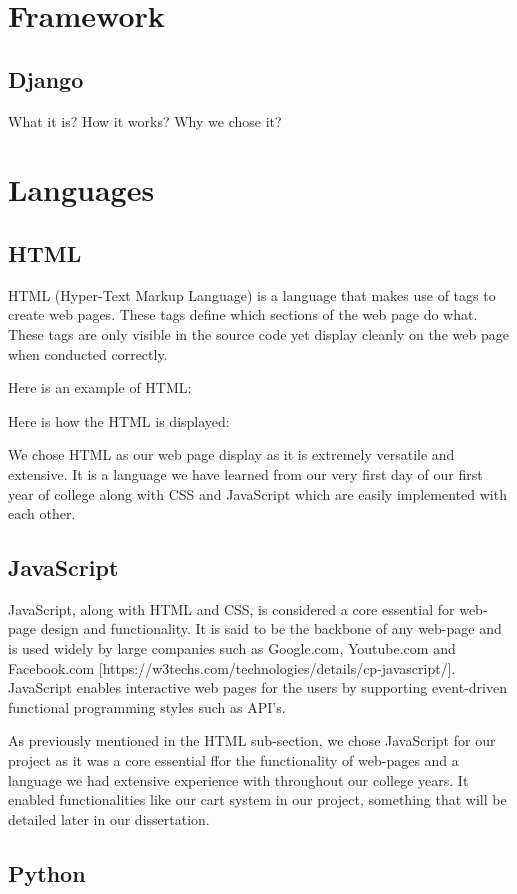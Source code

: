 \section{Framework}
\subsection{Django}
What it is?
How it works?
Why we chose it?

\section{Languages}
\subsection{HTML}
HTML (Hyper-Text Markup Language) is a language that makes use of tags to create web pages. These tags define which sections of the web page do what. These tags are only visible in the source code yet display cleanly on the web page when conducted correctly.

Here is an example of HTML:

Here is how the HTML is displayed:


We chose HTML as our web page display as it is extremely versatile and extensive. It is a language we have learned from our very first day of our first year of college along with CSS and JavaScript which are easily implemented with each other.

\subsection{JavaScript}
JavaScript, along with HTML and CSS, is considered a core essential for web-page design and functionality. It is said to be the backbone of any web-page and is used widely by large companies such as Google.com, Youtube.com and Facebook.com [https://w3techs.com/technologies/details/cp-javascript/]. JavaScript enables interactive web pages for the users by supporting event-driven functional programming styles such as API's.

As previously mentioned in the HTML sub-section, we chose JavaScript for our project as it was a core essential ffor the functionality of web-pages and a language we had extensive experience with throughout our college years. It enabled functionalities like our cart system in our project, something that will be detailed later in our dissertation.

\subsection{Python}



